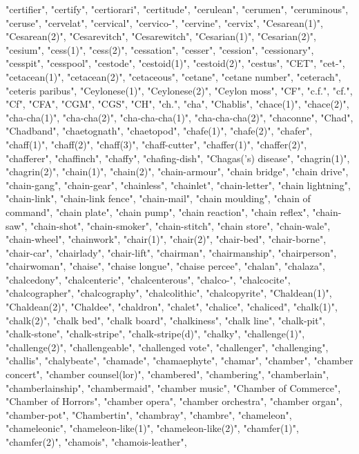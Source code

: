 "certifier",
"certify",
"certiorari",
"certitude",
"cerulean",
"cerumen",
"ceruminous",
"ceruse",
"cervelat",
"cervical",
"cervico-",
"cervine",
"cervix",
"Cesarean(1)",
"Cesarean(2)",
"Cesarevitch",
"Cesarewitch",
"Cesarian(1)",
"Cesarian(2)",
"cesium",
"cess(1)",
"cess(2)",
"cessation",
"cesser",
"cession",
"cessionary",
"cesspit",
"cesspool",
"cestode",
"cestoid(1)",
"cestoid(2)",
"cestus",
"CET",
"cet-",
"cetacean(1)",
"cetacean(2)",
"cetaceous",
"cetane",
"cetane number",
"ceterach",
"ceteris paribus",
"Ceylonese(1)",
"Ceylonese(2)",
"Ceylon moss",
"CF",
"c.f.",
"cf.",
"Cf",
"CFA",
"CGM",
"CGS",
"CH",
"ch.",
"cha",
"Chablis",
"chace(1)",
"chace(2)",
"cha-cha(1)",
"cha-cha(2)",
"cha-cha-cha(1)",
"cha-cha-cha(2)",
"chaconne",
"Chad",
"Chadband",
"chaetognath",
"chaetopod",
"chafe(1)",
"chafe(2)",
"chafer",
"chaff(1)",
"chaff(2)",
"chaff(3)",
"chaff-cutter",
"chaffer(1)",
"chaffer(2)",
"chafferer",
"chaffinch",
"chaffy",
"chafing-dish",
"Chagas('s) disease",
"chagrin(1)",
"chagrin(2)",
"chain(1)",
"chain(2)",
"chain-armour",
"chain bridge",
"chain drive",
"chain-gang",
"chain-gear",
"chainless",
"chainlet",
"chain-letter",
"chain lightning",
"chain-link",
"chain-link fence",
"chain-mail",
"chain moulding",
"chain of command",
"chain plate",
"chain pump",
"chain reaction",
"chain reflex",
"chain-saw",
"chain-shot",
"chain-smoker",
"chain-stitch",
"chain store",
"chain-wale",
"chain-wheel",
"chainwork",
"chair(1)",
"chair(2)",
"chair-bed",
"chair-borne",
"chair-car",
"chairlady",
"chair-lift",
"chairman",
"chairmanship",
"chairperson",
"chairwoman",
"chaise",
"chaise longue",
"chaise percee",
"chalan",
"chalaza",
"chalcedony",
"chalcenteric",
"chalcenterous",
"chalco-",
"chalcocite",
"chalcographer",
"chalcography",
"chalcolithic",
"chalcopyrite",
"Chaldean(1)",
"Chaldean(2)",
"Chaldee",
"chaldron",
"chalet",
"chalice",
"chaliced",
"chalk(1)",
"chalk(2)",
"chalk bed",
"chalk board",
"chalkiness",
"chalk line",
"chalk-pit",
"chalk-stone",
"chalk-stripe",
"chalk-stripe(d)",
"chalky",
"challenge(1)",
"challenge(2)",
"challengeable",
"challenged vote",
"challenger",
"challenging",
"challis",
"chalybeate",
"chamade",
"chamaephyte",
"chamar",
"chamber",
"chamber concert",
"chamber counsel(lor)",
"chambered",
"chambering",
"chamberlain",
"chamberlainship",
"chambermaid",
"chamber music",
"Chamber of Commerce",
"Chamber of Horrors",
"chamber opera",
"chamber orchestra",
"chamber organ",
"chamber-pot",
"Chambertin",
"chambray",
"chambre",
"chameleon",
"chameleonic",
"chameleon-like(1)",
"chameleon-like(2)",
"chamfer(1)",
"chamfer(2)",
"chamois",
"chamois-leather",
